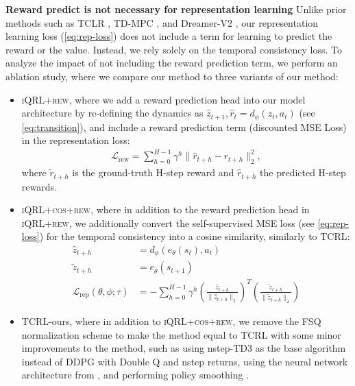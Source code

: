\documentclass{article}
\theoremstyle{plain}
\theoremstyle{definition}
\theoremstyle{remark}
\newcommand{\ourrew}{\textsc{iQRL+rew}\xspace}
\newcommand{\ourcosrew}{\textsc{iQRL+cos+rew}\xspace}
\begin{document}
\textbf{Reward predict is not necessary for representation learning}
Unlike prior methods such as TCLR \cite{zhaoSimplifiedTemporalConsistency2023}, TD-MPC \cite{hansenTemporalDifferenceLearning2022}, and Dreamer-V2 \cite{hafnerMasteringAtariDiscrete2022}, our representation learning loss (\cref{eq:rep-loss}) does not include a term for learning to predict the reward or the value. Instead, we rely solely on the temporal consistency loss. To analyze the impact of not including the reward prediction term, we perform an ablation study, where we compare our method to three variants of our method:
\begin{itemize}
	\item \ourrew, where we add a reward prediction head into our model architecture by re-defining the dynamics as $\hat{z}_{t+1}, \hat{r}_t = d_{\phi} (z_{t}, a_{t})$ (see \cref{eq:transition}), and include a reward prediction term (discounted MSE Loss) in the representation loss:
	\begin{align*}
		\mathcal{L}_\text{rew} = \sum_{h=0}^{H-1} \gamma^h \| \hat{r}_{t+h} - r_{t+h}\|_2^2,
	\end{align*}
	where $\tilde{r}_{t+h}$ is the ground-truth H-step reward and $\hat{r}_{t+h}$ the predicted H-step rewards.
	\item \ourcosrew, where in addition to the reward prediction head in \ourrew, we additionally convert the self-supervised MSE loss (see \cref{eq:rep-loss}) for the temporal consistency into a cosine similarity, similarly to TCRL:
	\begin{align*} \label{eq:rep-loss}
		\hat{z}_{t+h} &= d_{\phi}(e_{\theta}(s_{t}), a_{t}) \\
		\tilde{z}_{t+h} &= e_{\bar{\theta}}(s_{t+1}) \\
		\mathcal{L}_{\text{rep}}(\theta, \phi; \tau)
		&= - \sum_{h=0}^{H-1} \gamma^{h} \left ( \frac{\hat{z}_{t+h}}{\| \hat{z}_{t+h} \|_2} \right )^T \left ( \frac{\tilde{z}_{t+h}}{\| \tilde{z}_{t+h} \|_2} \right )
	\end{align*}
	\item TCRL-ours, where in addition to \ourcosrew, we remove the FSQ normalization scheme to make the method equal to TCRL with some minor improvements to the method, such as using nstep-TD3 \cite{fujimotoAddressingFunctionApproximation2018} as the base algorithm instead of DDPG with Double Q and nstep returns, using the neural network architecture from \citet{hansen2023td}, and performing policy smoothing \cite{fujimotoAddressingFunctionApproximation2018}.
\end{itemize}
\end{document}
